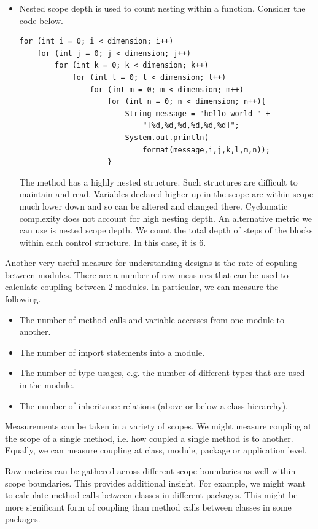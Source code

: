 \documentclass[a4paper, openany]{memoir}
\begin{document}
\begin{itemize}
    \item Nested scope depth is used to count nesting within a function. Consider the code below.
\begin{verbatim}
for (int i = 0; i < dimension; i++)
    for (int j = 0; j < dimension; j++)
        for (int k = 0; k < dimension; k++)
            for (int l = 0; l < dimension; l++)
                for (int m = 0; m < dimension; m++)
                    for (int n = 0; n < dimension; n++){
                        String message = "hello world " + 
                            "[%d,%d,%d,%d,%d,%d]";
                        System.out.println(
                            format(message,i,j,k,l,m,n));
                    }
\end{verbatim}
    The method has a highly nested structure. Such structures are difficult to maintain and read. Variables declared higher up in the scope are within scope much lower down and so can be altered and changed there. Cyclomatic complexity does not account for high nesting depth. An alternative metric we can use is nested scope depth. We count the total depth of steps of the blocks within each control structure. In this case, it is 6.
\end{itemize}

Another very useful measure for understanding designs is the rate of copuling between modules. There are a number of raw measures that can be used to calculate coupling between 2 modules. In particular, we can measure the following.
\begin{itemize}
    \item The number of method calls and variable accesses from one module to another.
    \item The number of import statements into a module.
    \item The number of type usages, e.g. the number of different types that are used in the module.
    \item The number of inheritance relations (above or below a class hierarchy).
\end{itemize}

Measurements can be taken in a variety of scopes. We might measure coupling at the scope of a single method, i.e. how coupled a single method is to another. Equally, we can measure coupling at class, module, package or application level.

Raw metrics can be gathered across different scope boundaries as well within scope boundaries. This provides additional insight. For example, we might want to calculate method calls between classes in different packages. This might be more significant form of coupling than method calls between classes in some packages.
\end{document}
